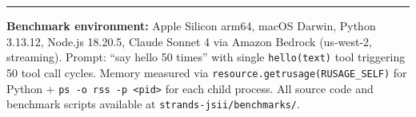 \documentclass[11pt]{article}
\begin{document}
\vspace{0.8em}
\begin{center}
\color{chartgray}\rule{0.4\textwidth}{0.5pt}
\end{center}
\vspace{0.3em}

{\small\color{strandsgray}\sffamily
\textbf{Benchmark environment:} Apple Silicon arm64, macOS Darwin, Python 3.13.12, Node.js 18.20.5, Claude Sonnet 4 via Amazon Bedrock (us-west-2, streaming). Prompt: ``say hello 50 times'' with single \texttt{hello(text)} tool triggering 50 tool call cycles. Memory measured via \texttt{resource.getrusage(RUSAGE\_SELF)} for Python + \texttt{ps -o rss -p <pid>} for each child process. All source code and benchmark scripts available at \texttt{strands-jsii/benchmarks/}.
}
\end{document}
